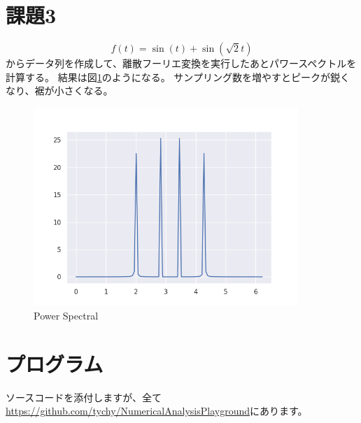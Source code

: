 \documentclass{jsarticle}
\begin{document}
\section{課題3}
\begin{equation}
    f(t) = \sin(t) + \sin(\sqrt{2}t)
\end{equation}
からデータ列を作成して、離散フーリエ変換を実行したあとパワースペクトルを計算する。
結果は図\ref{f7}のようになる。
サンプリング数を増やすとピークが鋭くなり、裾が小さくなる。
\begin{figure}[htbp]
    \includegraphics[clip,width=10.0cm]{./power.png}
    \caption{Power Spectral}
    \label{f7}
\end{figure}
\section{プログラム}
ソースコードを添付しますが、全て
\href{https://github.com/tychy/NumericalAnalysisPlayground}{https://github.com/tychy/NumericalAnalysisPlayground}にあります。
\begin{lstlisting}[caption=gaussの消去法,label=参照ラベル]
\end{lstlisting}


\end{document}
